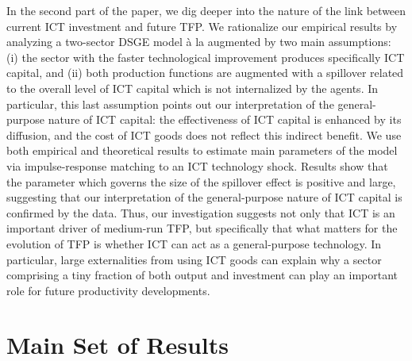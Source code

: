 \documentclass[12pt]{article}
\begin{document}
In the second part of the paper, we dig deeper into the nature of the link between current ICT investment and future TFP. We rationalize our empirical results by analyzing a two-sector DSGE model \`a la \cite{greenwood1997long} augmented by two main assumptions: (i) the sector with the faster technological improvement produces specifically ICT capital, and (ii) both production functions are augmented with a spillover related to the overall level of ICT capital which is not internalized by the agents. In particular, this last assumption points out our interpretation of the general-purpose nature of ICT capital: the effectiveness of ICT capital is enhanced by its diffusion, and the cost of ICT goods does not reflect this indirect benefit. We use both empirical and theoretical results to estimate main parameters of the model via impulse-response matching to an ICT technology shock. Results show that the parameter which governs the size of the spillover effect is positive and large, suggesting that our interpretation of the general-purpose nature of ICT capital is confirmed by the data. Thus, our investigation suggests not only that ICT is an important driver of medium-run TFP, but specifically that what matters for the evolution of TFP is whether ICT can act as a general-purpose technology. In particular, large externalities from using ICT goods can explain why a sector comprising a tiny fraction of both output and investment can play an important role for future productivity developments.











\newpage


\appendix 

\section{Main Set of Results}\label{section:mainSetResults}
\end{document}
